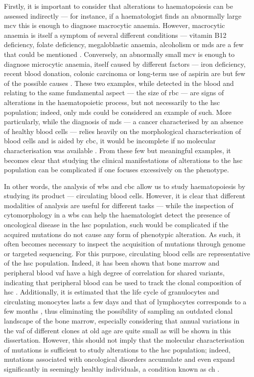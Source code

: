 Firstly, it is important to consider that alterations to haematopoiesis can be assessed indirectly --- for instance, if a haematologist finds an abnormally large \ac{mcv} this is enough to diagnose macrocytic anaemia. However, macrocytic anaemia is itself a symptom of several different conditions --- vitamin B12 deficiency, folate deficiency, megaloblastic anaemia, alcoholism or \ac{mds} are a few that could be mentioned \cite{Nagao2017-bx}. Conversely, an abnormally small \ac{mcv} is enough to diagnose microcytic anaemia, itself caused by different factors --- iron deficiency, recent blood donation, colonic carcinoma or long-term use of aspirin are but few of the possible causes \cite{Short2013-pz}. These two examples, while detected in the blood and relating to the same fundamental aspect --- the size of \ac{rbc} --- are signs of alterations in the haematopoietic process, but not necessarily to the \ac{hsc} population; indeed, only \ac{mds} could be considered an example of such. More particularly, while the diagnosis of \ac{mds} --- a cancer characterised by an absence of healthy blood cells --- relies heavily on the morphological characterisation of blood cells and is aided by \ac{cbc}, it would be incomplete if no molecular characterisation was available \cite{Invernizzi2015-ob}. From these few but meaningful examples, it becomes clear that studying the clinical manifestations of alterations to the \ac{hsc} population can be complicated if one focuses excessively on the phenotype.

In other words, the analysis of \ac{wbs} and \ac{cbc} allow us to study haematopoiesis by studying its product --- circulating blood cells. However, it is clear that different modalities of analysis are useful for different tasks --- while the inspection of cytomorphology in a \ac{wbs} can help the haematologist detect the presence of oncological disease in the \ac{hsc} population, such would be complicated if the acquired mutations do not cause any form of phenotypic alteration. As such, it often becomes necessary to inspect the acquisition of mutations through genome or targeted sequencing. For this purpose, circulating blood cells are representative of the \ac{hsc} population. Indeed, it has been shown that bone marrow and peripheral blood \ac{vaf} have a high degree of correlation for shared variants, indicating that peripheral blood can be used to track the clonal composition of \ac{hsc} \cite{Patkar2018-lp,Tong2015-oq,Coffey2019-rr}. Additionally, it is estimated that the life cycle of granulocytes and circulating monocytes lasts a few days and that of lymphocytes corresponds to a few months \cite{Resegotti1957-ut,Lahoz-Beneytez2016-zq,Patel2017-qx}, thus eliminating the possibility of sampling an outdated clonal landscape of the bone marrow, especially considering that annual variations in the \ac{vaf} of different clones at old age are quite small as will be shown in this dissertation. However, this should not imply that the molecular characterisation of mutations is sufficient to study alterations to the \ac{hsc} population; indeed, mutations associated with oncological disorders accumulate and even expand significantly in seemingly healthy individuals, a condition known as \ac{ch} \cite{Jaiswal2014-rl}. 

